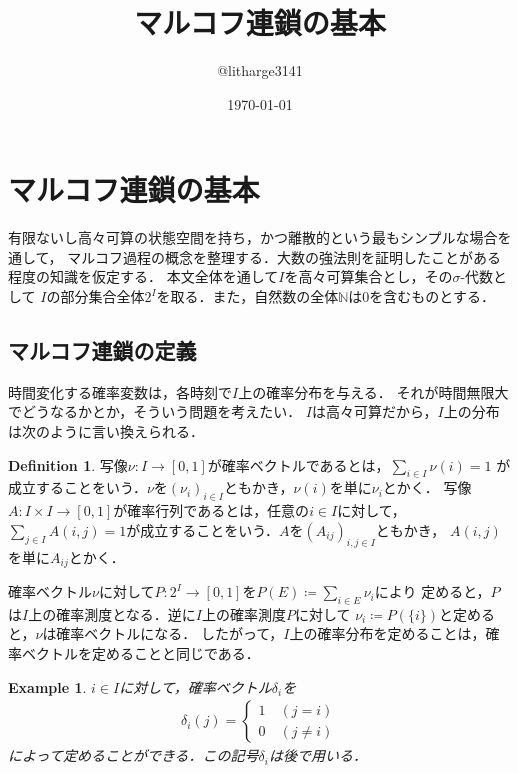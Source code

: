 \documentclass[dvipdfmx,autodetect-engine]{jsarticle}
\newtheorem{example}{Example}[section]
\theoremstyle{remark}
\theoremstyle{definition}
\newtheorem{definition}{Definition}[section]
\newcommand{\N}{\mathbb{N}}
\begin{document}
\title{マルコフ連鎖の基本}
\author{@litharge3141}
\date{\today}
\maketitle

\section{マルコフ連鎖の基本}
有限ないし高々可算の状態空間を持ち，かつ離散的という最もシンプルな場合を通して，
マルコフ過程の概念を整理する．大数の強法則を証明したことがある程度の知識を仮定する．
本文全体を通して$I$を高々可算集合とし，その$\sigma$-代数として
$I$の部分集合全体$2^{I}$を取る．また，自然数の全体$\N$は$0$を含むものとする．
\subsection{マルコフ連鎖の定義}
時間変化する確率変数は，各時刻で$I$上の確率分布を与える．
それが時間無限大でどうなるかとか，そういう問題を考えたい．
$I$は高々可算だから，$I$上の分布は次のように言い換えられる．


\begin{definition}
    写像$\nu \colon I \to [0,1]$が確率ベクトルであるとは，$\sum_{i\in I} \nu (i)=1$
    が成立することをいう．$\nu$を$(\nu_i)_{i\in I}$ともかき，$\nu(i)$を単に$\nu_i$とかく．
    写像$A\colon I\times I \to [0,1]$が確率行列であるとは，任意の$i\in I$に対して，
    $\sum_{j\in I} A(i,j) = 1$が成立することをいう．$A$を$(A_{ij})_{i,j\in I}$ともかき，
    $A(i,j)$を単に$A_{ij}$とかく．
\end{definition}


確率ベクトル$\nu$に対して$P\colon 2^{I} \to [0,1]$を$P(E) \coloneqq \sum_{i \in E} \nu_i$により
定めると，$P$は$I$上の確率測度となる．逆に$I$上の確率測度$P$に対して
$\nu_i \coloneqq P(\{i\})$と定めると，$\nu$は確率ベクトルになる．
したがって，$I$上の確率分布を定めることは，確率ベクトルを定めることと同じである．

\begin{example}
    $i \in I$に対して，確率ベクトル$\delta_i$を
    \begin{align}
        \delta_i (j) = 
        \begin{cases}
            1 \quad (j=i) \\
            0 \quad (j\neq i)
        \end{cases}
    \end{align}
    によって定めることができる．この記号$\delta_i$は後で用いる．
\end{example}
\end{document}
